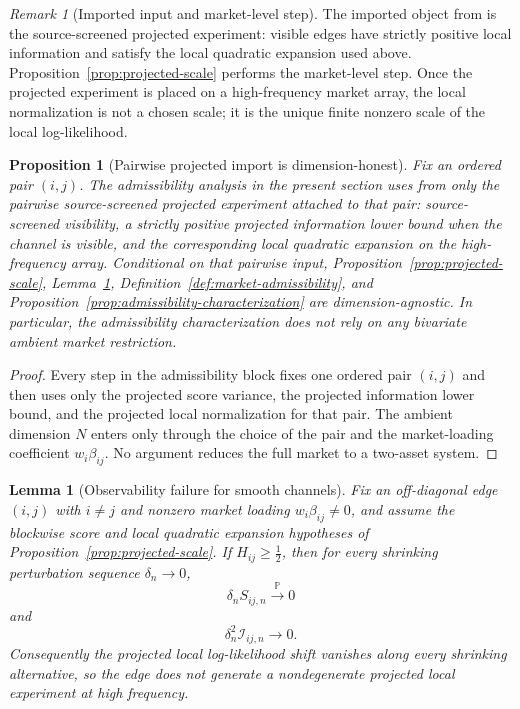\documentclass[11pt,a4paper]{amsart}
\theoremstyle{plain}
\newtheorem{proposition}[theorem]{Proposition}
\newtheorem{lemma}[theorem]{Lemma}
\theoremstyle{definition}
\theoremstyle{remark}
\newtheorem{remark}[theorem]{Remark}
\newcommand{\PP}{\mathbb{P}}
\newcommand{\toP}{\xrightarrow{\PP}}
\begin{document}
\begin{remark}[Imported input and market-level step]
The imported object from \cite{vidal2026econometric} is the source-screened projected experiment:
visible edges have strictly positive local information and satisfy the local quadratic expansion
used above.  Proposition~\ref{prop:projected-scale} performs the market-level step.  Once the
projected experiment is placed on a high-frequency market array, the local normalization is not a
chosen scale; it is the unique finite nonzero scale of the local log-likelihood.
\end{remark}

\begin{proposition}[Pairwise projected import is dimension-honest]\label{prop:pairwise-import}
Fix an ordered pair \((i,j)\).  The admissibility analysis in the present section uses from
\cite{vidal2026econometric} only the pairwise source-screened projected experiment attached to that
pair: source-screened visibility, a strictly positive projected information lower bound when the
channel is visible, and the corresponding local quadratic expansion on the high-frequency array.
Conditional on that pairwise input, Proposition~\ref{prop:projected-scale},
Lemma~\ref{lem:smooth-failure}, Definition~\ref{def:market-admissibility}, and
Proposition~\ref{prop:admissibility-characterization} are dimension-agnostic.  In particular, the
admissibility characterization does not rely on any bivariate ambient market restriction.
\end{proposition}

\begin{proof}
Every step in the admissibility block fixes one ordered pair \((i,j)\) and then uses only the
projected score variance, the projected information lower bound, and the projected local
normalization for that pair.  The ambient dimension \(N\) enters only through the choice of the
pair and the market-loading coefficient \(w_i\beta_{ij}\).  No argument reduces the full market to
a two-asset system.
\end{proof}

\begin{lemma}[Observability failure for smooth channels]\label{lem:smooth-failure}
Fix an off-diagonal edge \((i,j)\) with \(i\neq j\) and nonzero market loading
\(w_i\beta_{ij}\neq0\), and assume the blockwise score and local quadratic expansion hypotheses of
Proposition~\ref{prop:projected-scale}.  If \(H_{ij}\ge \tfrac12\), then for every shrinking
perturbation sequence \(\delta_n\to0\),
\[
        \delta_n S_{ij,n}\toP0
\]
and
\[
        \delta_n^2 \mathcal I_{ij,n}\to0.
\]
Consequently the projected local log-likelihood shift vanishes along every shrinking alternative, so
the edge does not generate a nondegenerate projected local experiment at high frequency.
\end{lemma}
\end{document}
